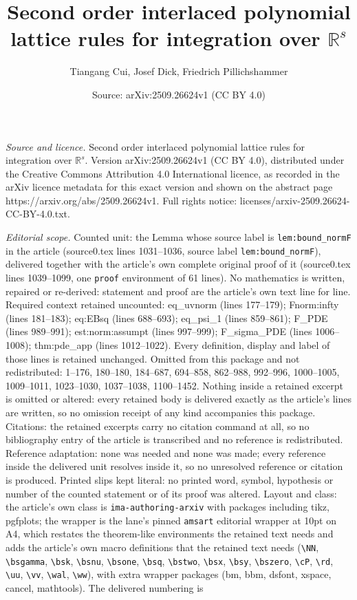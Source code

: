 \documentclass[10pt,a4paper]{amsart}
\title[Second order interlaced polynomial lattice rules for integra]{Second order interlaced polynomial lattice rules for integration over $\mathbb{R}^s$}
\author{Tiangang Cui, Josef Dick, Friedrich Pillichshammer}
\date{Source: arXiv:2509.26624v1 (CC BY 4.0)}
\begin{document}
\maketitle

\noindent\emph{Source and licence.} Second order interlaced polynomial lattice rules for integration over $\mathbb{R}^s$. Version arXiv:2509.26624v1 (CC BY 4.0), distributed under the Creative Commons Attribution 4.0 International licence, as recorded in the arXiv licence metadata for this exact version and shown on the abstract page https://arxiv.org/abs/2509.26624v1. Full rights notice: licenses/arxiv-2509.26624-CC-BY-4.0.txt.\par\smallskip

\noindent\textit{Editorial scope.} Counted unit: the Lemma whose source label is \texttt{lem:bound\_normF} in the article (source0.tex lines 1031--1036, source label \texttt{lem:bound\_normF}), delivered together with the article's own complete original proof of it (source0.tex lines 1039--1099, one \texttt{proof} environment of 61 lines). No mathematics is written, repaired or re-derived: statement and proof are the article's own text line for line. Required context retained uncounted: eq\_uvnorm (lines 177--179); Fnorm:infty (lines 181--183); eq:EBsq (lines 688--693); eq\_psi\_1 (lines 859--861); F\_PDE (lines 989--991); est:norm:assumpt (lines 997--999); F\_sigma\_PDE (lines 1006--1008); thm:pde\_app (lines 1012--1022). Every definition, display and label of those lines is retained unchanged. Omitted from this package and not redistributed: 1--176, 180--180, 184--687, 694--858, 862--988, 992--996, 1000--1005, 1009--1011, 1023--1030, 1037--1038, 1100--1452. Nothing inside a retained excerpt is omitted or altered: every retained body is delivered exactly as the article's lines are written, so no omission receipt of any kind accompanies this package. Citations: the retained excerpts carry no citation command at all, so no bibliography entry of the article is transcribed and no reference is redistributed. Reference adaptation: none was needed and none was made; every reference inside the delivered unit resolves inside it, so no unresolved reference or citation is produced. Printed slips kept literal: no printed word, symbol, hypothesis or number of the counted statement or of its proof was altered. Layout and class: the article's own class is \texttt{ima-authoring-arxiv} with packages including tikz, pgfplots; the wrapper is the lane's pinned \texttt{amsart} editorial wrapper at 10pt on A4, which restates the theorem-like environments the retained text needs and adds the article's own macro definitions that the retained text needs (\texttt{\textbackslash NN}, \texttt{\textbackslash bsgamma}, \texttt{\textbackslash bsk}, \texttt{\textbackslash bsnu}, \texttt{\textbackslash bsone}, \texttt{\textbackslash bsq}, \texttt{\textbackslash bstwo}, \texttt{\textbackslash bsx}, \texttt{\textbackslash bsy}, \texttt{\textbackslash bszero}, \texttt{\textbackslash cP}, \texttt{\textbackslash rd}, \texttt{\textbackslash uu}, \texttt{\textbackslash vv}, \texttt{\textbackslash wal}, \texttt{\textbackslash ww}), with extra wrapper packages (bm, bbm, dsfont, xspace, cancel, mathtools). The delivered numbering is 
\end{document}
